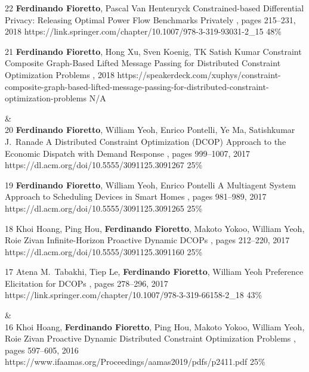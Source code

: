 \begin{pubs}
	\confentry 
		{22} %
		{{\bf Ferdinando Fioretto}, Pascal Van Hentenryck}
		{Constrained-based Differential Privacy: Releasing Optimal Power Flow Benchmarks Privately} 
		{\procCPAIOR, pages 215--231, 2018}
		{https://link.springer.com/chapter/10.1007/978-3-319-93031-2\_15}
	    {48\%}

	\confentry
		{21} %
		{{\bf Ferdinando Fioretto}, Hong Xu, Sven Koenig, TK Satish Kumar}
		{Constraint Composite Graph-Based Lifted Message Passing for Distributed Constraint Optimization Problems}
		{\procISIAM, 2018}
		{https://speakerdeck.com/xuphys/constraint-composite-graph-based-lifted-message-passing-for-distributed-constraint-optimization-problems}
		{N/A}

{}&\nemph{\rule{0.5\linewidth}{0.5pt}}\\[1em]
	\confentry 
		{20} %
		{{\bf Ferdinando Fioretto}, William Yeoh, Enrico Pontelli, Ye Ma, Satishkumar J.~Ranade}
		{A Distributed Constraint Optimization (DCOP) Approach to the Economic Dispatch with Demand Response}
		{\procAAMAS, pages  999--1007, 2017}
		{https://dl.acm.org/doi/10.5555/3091125.3091267}
		{25\%}%

	\confentry 
		{19} %
		{{\bf Ferdinando Fioretto},  William Yeoh, Enrico Pontelli}
		{A Multiagent System Approach to Scheduling Devices in Smart Homes}
		{\procAAMAS, pages 981--989, 2017} 
		{https://dl.acm.org/doi/10.5555/3091125.3091265}
		{25\%}%

	\confentry
		{18} %
		{Khoi Hoang, Ping Hou, {\bf Ferdinando Fioretto}, Makoto Yokoo, William Yeoh, Roie Zivan}
		{Infinite-Horizon Proactive Dynamic DCOPs}
		{\procAAMAS, pages 212--220, 2017}
		{https://dl.acm.org/doi/10.5555/3091125.3091160}
		{25\%}%

	\confentry 
		{17} %
		{Atena M.~Tabakhi, Tiep Le, {\bf Ferdinando Fioretto}, William Yeoh}
		{Preference Elicitation for DCOPs}
		{\procCP, pages 278--296, 2017}
		{https://link.springer.com/chapter/10.1007/978-3-319-66158-2\_18}
		{43\%}%

{}& \nemph{\rule{0.5\linewidth}{0.5pt}}\\[1em]
	\confentry 
		{16} %
		{Khoi Hoang, {\bf Ferdinando Fioretto}, Ping Hou, Makoto Yokoo, William Yeoh, Roie Zivan}
		{Proactive Dynamic Distributed Constraint Optimization Problems} 
		{\procAAMAS, pages 597--605, 2016}
		{https://www.ifaamas.org/Proceedings/aamas2019/pdfs/p2411.pdf}
		{25\%}%


\end{pubs}

